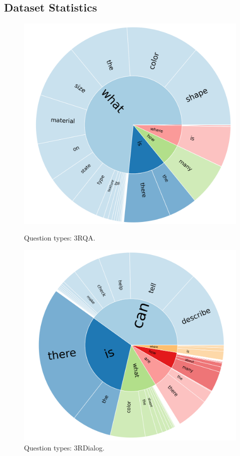 \subsection{Dataset Statistics}
\label{app:dataset statistics}

\begin{figure}[t!]
    \centering
    \begin{minipage}[b]{0.45\textwidth}
        \includegraphics[width=1\textwidth]{figs/Rscan_qa_question_stat.png}
        \caption{Question types: 3RQA.}
        \label{fig:RscanQA_statistics}
    \end{minipage}
    \hfill
    \begin{minipage}[b]{0.467\textwidth}
        \includegraphics[width=1\textwidth]{figs/Rscan_dialogue_question_stat.png}
        \caption{Question types: 3RDialog.}
        \label{fig:RscanDialog_Q_statistics}
    \end{minipage}
\end{figure}


